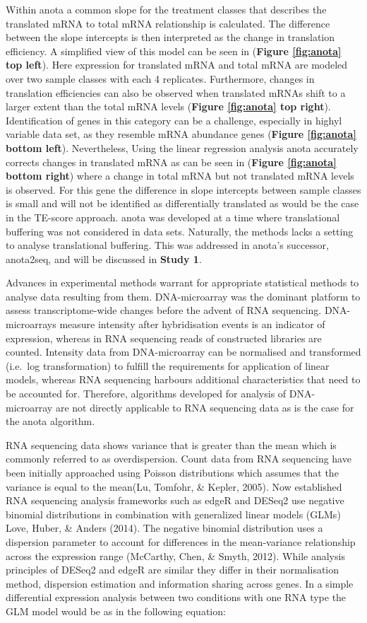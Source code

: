 \documentclass[
  12pt,
  openany]{book}
\begin{document}
Within anota a common slope for the treatment classes that describes the translated mRNA to total mRNA relationship is calculated. The difference between the slope intercepts is then interpreted as the change in translation efficiency. A simplified view of this model can be seen in (\textbf{Figure \ref{fig:anota} top left}). Here expression for translated mRNA and total mRNA are modeled over two sample classes with each 4 replicates. Furthermore, changes in translation efficiencies can also be observed when translated mRNAs shift to a larger extent than the total mRNA levels (\textbf{Figure \ref{fig:anota} top right}). Identification of genes in this category can be a challenge, especially in highyl variable data set, as they resemble mRNA abundance genes (\textbf{Figure \ref{fig:anota} bottom left}). Nevertheless, Using the linear regression analysis anota accurately corrects changes in translated mRNA as can be seen in (\textbf{Figure \ref{fig:anota} bottom right}) where a change in total mRNA but not translated mRNA levels is observed. For this gene the difference in slope intercepts between sample classes is small and will not be identified as differentially translated as would be the case in the TE-score approach. anota was developed at a time where translational buffering was not considered in data sets. Naturally, the methods lacks a setting to analyse translational buffering. This was addressed in anota's successor, anota2seq, and will be discussed in \textbf{Study 1}.

Advances in experimental methods warrant for appropriate statistical methods to analyse data resulting from them. DNA-microarray was the dominant platform to assess transcriptome-wide changes before the advent of RNA sequencing. DNA-microarrays measure intensity after hybridisation events is an indicator of expression, whereas in RNA sequencing reads of constructed libraries are counted. Intensity data from DNA-microarray can be normalised and transformed (i.e.~log transformation) to fulfill the requirements for application of linear models, whereas RNA sequencing harbours additional characteristics that need to be accounted for. Therefore, algorithms developed for analysis of DNA- microarray are not directly applicable to RNA sequencing data as is the case for the anota algorithm.

RNA sequencing data shows variance that is greater than the mean which is commonly referred to as overdispersion. Count data from RNA sequencing have been initially approached using Poisson distributions which assumes that the variance is equal to the mean(Lu, Tomfohr, \& Kepler, 2005). Now established RNA sequencing analysis frameworks such as edgeR and DESeq2 use negative binomial distributions in combination with generalized linear models (GLMs) Love, Huber, \& Anders (2014). The negative binomial distribution uses a dispersion parameter to account for differences in the mean-variance relationship across the expression range (McCarthy, Chen, \& Smyth, 2012). While analysis principles of DESeq2 and edgeR are similar they differ in their normalisation method, dispersion estimation and information sharing across genes. In a simple differential expression analysis between two conditions with one RNA type the GLM model would be as in the following equation:
\end{document}

